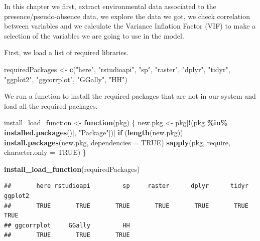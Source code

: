 \documentclass[
]{book}
\newenvironment{Shaded}{\begin{snugshade}}{\end{snugshade}}
\newcommand{\AttributeTok}[1]{\textcolor[rgb]{0.13,0.29,0.53}{#1}}
\newcommand{\ConstantTok}[1]{\textcolor[rgb]{0.56,0.35,0.01}{#1}}
\newcommand{\ControlFlowTok}[1]{\textcolor[rgb]{0.13,0.29,0.53}{\textbf{#1}}}
\newcommand{\FunctionTok}[1]{\textcolor[rgb]{0.13,0.29,0.53}{\textbf{#1}}}
\newcommand{\NormalTok}[1]{#1}
\newcommand{\OtherTok}[1]{\textcolor[rgb]{0.56,0.35,0.01}{#1}}
\newcommand{\SpecialCharTok}[1]{\textcolor[rgb]{0.81,0.36,0.00}{\textbf{#1}}}
\newcommand{\StringTok}[1]{\textcolor[rgb]{0.31,0.60,0.02}{#1}}
\begin{document}
In this chapter we first, extract environmental data associated to the presence/pseudo-absence data, we explore the data we got, we check correlation between variables and we calculate the Variance Inflation Factor (VIF) to make a selection of the variables we are going to use in the model.

First, we load a list of required libraries.

\begin{Shaded}
\begin{Highlighting}[]
\NormalTok{requiredPackages }\OtherTok{\textless{}{-}} \FunctionTok{c}\NormalTok{(}\StringTok{"here"}\NormalTok{, }\StringTok{"rstudioapi"}\NormalTok{,}
    \StringTok{"sp"}\NormalTok{, }\StringTok{"raster"}\NormalTok{, }\StringTok{"dplyr"}\NormalTok{, }\StringTok{"tidyr"}\NormalTok{, }\StringTok{"ggplot2"}\NormalTok{,}
    \StringTok{"ggcorrplot"}\NormalTok{, }\StringTok{"GGally"}\NormalTok{, }\StringTok{"HH"}\NormalTok{)}
\end{Highlighting}
\end{Shaded}

We run a function to install the required packages that are not in our system and load all the required packages.

\begin{Shaded}
\begin{Highlighting}[]
\NormalTok{install\_load\_function }\OtherTok{\textless{}{-}} \ControlFlowTok{function}\NormalTok{(pkg) \{}
\NormalTok{    new.pkg }\OtherTok{\textless{}{-}}\NormalTok{ pkg[}\SpecialCharTok{!}\NormalTok{(pkg }\SpecialCharTok{\%in\%} \FunctionTok{installed.packages}\NormalTok{()[,}
        \StringTok{"Package"}\NormalTok{])]}
    \ControlFlowTok{if}\NormalTok{ (}\FunctionTok{length}\NormalTok{(new.pkg))}
        \FunctionTok{install.packages}\NormalTok{(new.pkg, }\AttributeTok{dependencies =} \ConstantTok{TRUE}\NormalTok{)}
    \FunctionTok{sapply}\NormalTok{(pkg, require, }\AttributeTok{character.only =} \ConstantTok{TRUE}\NormalTok{)}
\NormalTok{\}}

\FunctionTok{install\_load\_function}\NormalTok{(requiredPackages)}
\end{Highlighting}
\end{Shaded}

\begin{verbatim}
##       here rstudioapi         sp     raster      dplyr      tidyr    ggplot2 
##       TRUE       TRUE       TRUE       TRUE       TRUE       TRUE       TRUE 
## ggcorrplot     GGally         HH 
##       TRUE       TRUE       TRUE
\end{verbatim}
\end{document}
